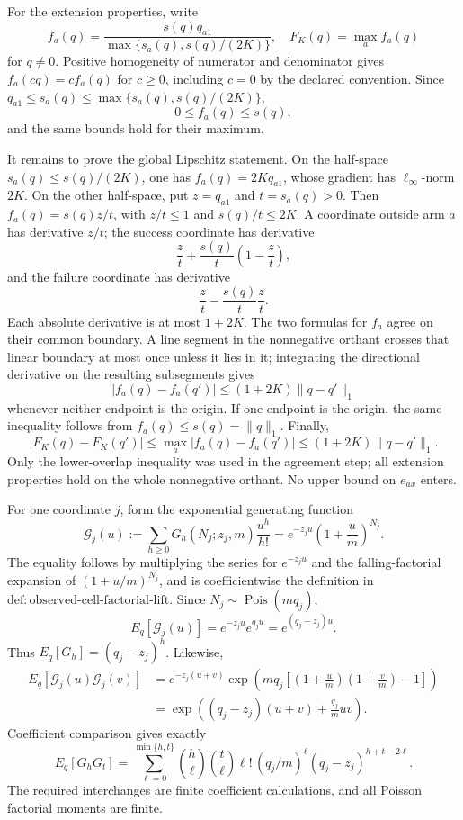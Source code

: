 For the extension properties, write
\[
 f_a(q)=\frac{s(q)q_{a1}}{\max\{s_a(q),s(q)/(2K)\}},
 \quad F_K(q)=\max_a f_a(q)
\]
for \(q\neq0\).  Positive homogeneity of numerator and denominator gives \(f_a(cq)=cf_a(q)\) for \(c\geq0\), including \(c=0\) by the declared convention.  Since \(q_{a1}\leq s_a(q)\leq\max\{s_a(q),s(q)/(2K)\}\),
\[
 0\leq f_a(q)\leq s(q),
\]
and the same bounds hold for their maximum.

It remains to prove the global Lipschitz statement.  On the half-space \(s_a(q)\leq s(q)/(2K)\), one has \(f_a(q)=2Kq_{a1}\), whose gradient has \(\ell_\infty\)-norm \(2K\).  On the other half-space, put \(z=q_{a1}\) and \(t=s_a(q)>0\).  Then \(f_a(q)=s(q)z/t\), with \(z/t\leq1\) and \(s(q)/t\leq2K\).  A coordinate outside arm \(a\) has derivative \(z/t\); the success coordinate has derivative
\[
 \frac zt+\frac{s(q)}t\left(1-\frac zt\right),
\]
and the failure coordinate has derivative
\[
 \frac zt-\frac{s(q)}t\frac zt.
\]
Each absolute derivative is at most \(1+2K\).  The two formulas for \(f_a\) agree on their common boundary.  A line segment in the nonnegative orthant crosses that linear boundary at most once unless it lies in it; integrating the directional derivative on the resulting subsegments gives
\[
 |f_a(q)-f_a(q')|\leq(1+2K)\|q-q'\|_1
\]
whenever neither endpoint is the origin.  If one endpoint is the origin, the same inequality follows from \(f_a(q)\leq s(q)=\|q\|_1\).  Finally,
\[
 |F_K(q)-F_K(q')|
 \leq\max_a|f_a(q)-f_a(q')|
 \leq(1+2K)\|q-q'\|_1.
\]
Only the lower-overlap inequality was used in the agreement step; all extension properties hold on the whole nonnegative orthant.  No upper bound on \(e_{ax}\) enters.

For one coordinate \(j\), form the exponential generating function
\[
 \mathcal G_j(u):=\sum_{h\geq0}G_h(N_j;z_j,m)\frac{u^h}{h!}
 =e^{-z_ju}\left(1+\frac um\right)^{N_j}.
\]
The equality follows by multiplying the series for \(e^{-z_ju}\) and the falling-factorial expansion of \((1+u/m)^{N_j}\), and is coefficientwise the definition in \(\mathrm{def{:}observed\text{-}cell\text{-}factorial\text{-}lift}\).  Since \(N_j\sim\operatorname{Pois}(mq_j)\),
\[
 E_q[\mathcal G_j(u)]=e^{-z_ju}e^{q_ju}=e^{(q_j-z_j)u}.
\]
Thus \(E_q[G_h]=(q_j-z_j)^h\).  Likewise,
\[
 \begin{aligned}
 E_q[\mathcal G_j(u)\mathcal G_j(v)]
 &=e^{-z_j(u+v)}
   \exp\!\left(mq_j\left[\left(1+\frac um\right)
                                 \left(1+\frac vm\right)-1\right]\right)\\
 &=\exp\!\left((q_j-z_j)(u+v)+\frac{q_j}{m}uv\right).
 \end{aligned}
\]
Coefficient comparison gives exactly
\[
 E_q[G_hG_t]
 =\sum_{\ell=0}^{\min\{h,t\}}
   \binom h\ell\binom t\ell\ell!\,(q_j/m)^\ell
   (q_j-z_j)^{h+t-2\ell}.
\]
The required interchanges are finite coefficient calculations, and all Poisson factorial moments are finite.

